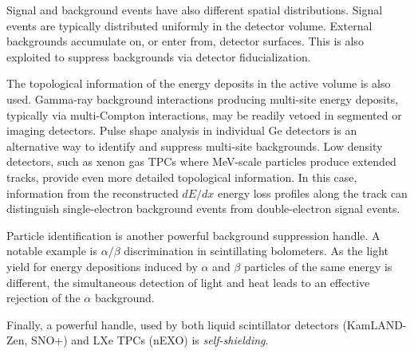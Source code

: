 Signal and background events have also different spatial distributions. Signal events are typically distributed uniformly in the detector volume. External backgrounds accumulate on, or enter from, detector surfaces. This is also exploited to suppress backgrounds via detector fiducialization. 

The topological information of the energy deposits in the active volume is also used. Gamma-ray background interactions producing multi-site energy deposits, typically via multi-Compton interactions, may be readily vetoed in segmented or imaging detectors. Pulse shape analysis in individual Ge detectors is an alternative way to identify and suppress multi-site backgrounds. Low density detectors, such as xenon gas TPCs where MeV-scale particles produce extended tracks, provide even more detailed topological information. In this case, information from the reconstructed $dE/dx$ energy loss profiles along the track can distinguish single-electron background events from double-electron signal events.

Particle identification is another powerful background suppression handle. A notable example is $\alpha/\beta$ discrimination in scintillating bolometers. As the light yield for energy depositions induced by $\alpha$ and $\beta$ particles of the same energy is different, the simultaneous detection of light and heat leads to an effective rejection of the $\alpha$ background. 

Finally, a powerful handle, used by both liquid scintillator detectors (KamLAND-Zen, SNO+) and LXe TPCs (nEXO) is {\em self-shielding}. 


